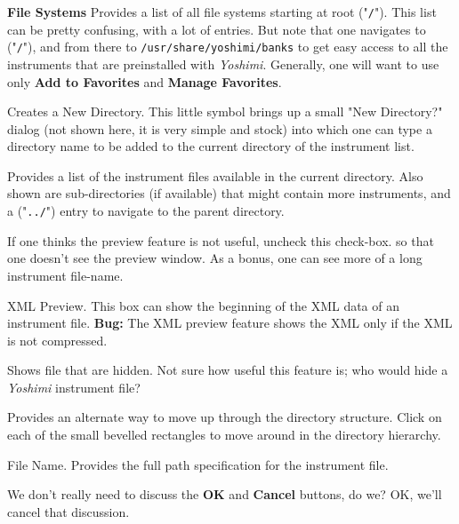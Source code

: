    \textbf{File Systems} 
   Provides a list of all file systems starting at root ("\texttt{/}").
   This list can be pretty confusing, with a lot of entries.
   But note that one navigates to ("\texttt{/}"), and from there to
   \texttt{/usr/share/yoshimi/banks} to get easy access to all the
   instruments that are preinstalled with
   \textsl{Yoshimi}.
   Generally, one will want to use only
   \textbf{Add to Favorites} and \textbf{Manage Favorites}.

   Creates a New Directory.
   This little symbol brings up a small "New Directory?" dialog (not shown
   here, it is very simple and stock) into which one can type a directory
   name to be added to the current directory of the instrument list.

   Provides a list of the instrument files available in the current
   directory.  Also shown are sub-directories (if available)
   that might contain more instruments, and a ("\texttt{../}") entry
   to navigate to the parent directory.

   If one thinks the preview feature is not useful, uncheck this check-box.
   so that one doesn't see the preview window.  As a bonus, one can see more
   of a long instrument file-name.

   XML Preview.
   This box can show the beginning of the XML data of an instrument file.
   \textbf{Bug:}
   The XML preview feature shows the XML only if the XML is not compressed.

   Shows file that are hidden.  Not sure how useful this feature is;
   who would hide a \textsl{Yoshimi} instrument file?

   Provides an alternate way to move up through the directory structure.
   Click on each of the small bevelled rectangles to move around in the
   directory hierarchy.

   File Name.
   Provides the full path specification for the instrument file.

   We don't really need to discuss the \textbf{OK} and \textbf{Cancel}
   buttons, do we?  OK, we'll cancel that discussion.
\fi
